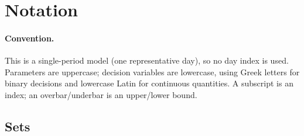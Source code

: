 \documentclass[10pt]{article}
\begin{document}
\section{Notation}

\paragraph{Convention.}
This is a single-period model (one representative day), so no day index is used.
Parameters are uppercase; decision variables are lowercase, using Greek letters for binary decisions and lowercase Latin for continuous quantities.
A subscript is an index; an overbar/underbar is an upper/lower bound.

\subsection{Sets}
\end{document}
